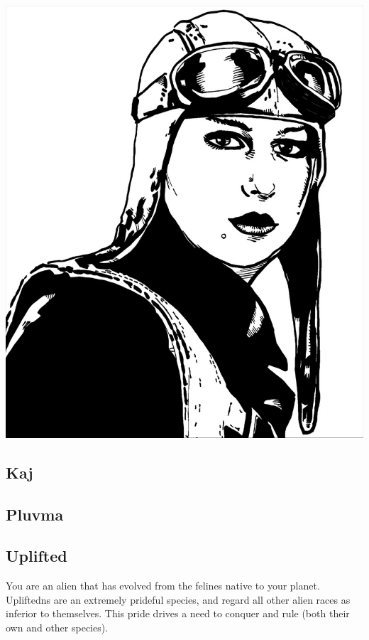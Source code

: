 \documentclass[10pt,twoside]{article}
\begin{document}
\begin{multicols}{2}
  \includegraphics[width=\linewidth]{TCP-Steampunk-4}
    
  \columnbreak
      
  \subsection{Kaj}
  
  \columnbreak
  
  \subsection{Pluvma}
  
  \columnbreak

  \subsection{Uplifted}
      
  You are an alien that has evolved from the felines native to your planet. Upliftedns are an extremely prideful species, and regard all other alien races as inferior to themselves. This pride drives a need to conquer and rule (both their own and other species).
      

\end{multicols}
\end{document}
